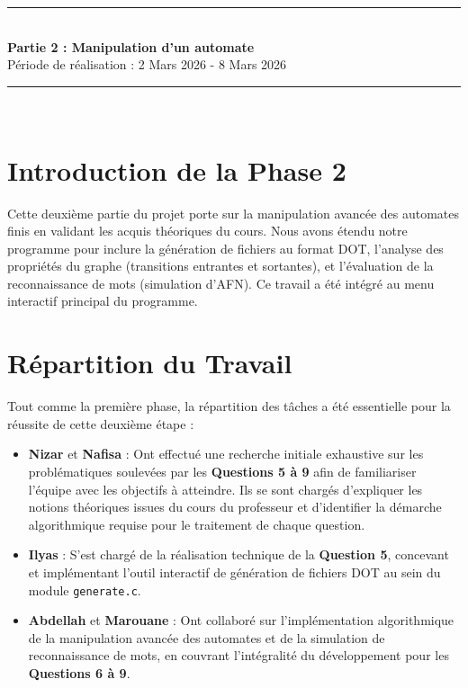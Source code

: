 \documentclass[12pt,a4paper]{article}
\newcommand{\HRule}{\rule{\linewidth}{0.5mm}}
\begin{document}
\newpage
\begin{center}
\vspace*{1cm}
\HRule \\[0.5cm]
\textbf{\huge Partie 2 : Manipulation d'un automate} \\[0.5cm]
\Large Période de réalisation : 2 Mars 2026 - 8 Mars 2026 \\
\HRule \\
\vspace*{1cm}
\end{center}

\section{Introduction de la Phase 2}
Cette deuxième partie du projet porte sur la manipulation avancée des automates finis en validant les acquis théoriques du cours. Nous avons étendu notre programme pour inclure la génération de fichiers au format DOT, l'analyse des propriétés du graphe (transitions entrantes et sortantes), et l'évaluation de la reconnaissance de mots (simulation d'AFN). Ce travail a été intégré au menu interactif principal du programme.

\section{Répartition du Travail}
Tout comme la première phase, la répartition des tâches a été essentielle pour la réussite de cette deuxième étape :
\begin{itemize}
\item \textbf{Nizar} et \textbf{Nafisa} : Ont effectué une recherche initiale exhaustive sur les problématiques soulevées par les \textbf{Questions 5 à 9} afin de familiariser l'équipe avec les objectifs à atteindre. Ils se sont chargés d'expliquer les notions théoriques issues du cours du professeur et d'identifier la démarche algorithmique requise pour le traitement de chaque question.
\item \textbf{Ilyas} : S'est chargé de la réalisation technique de la \textbf{Question 5}, concevant et implémentant l'outil interactif de génération de fichiers DOT au sein du module \texttt{generate.c}.
\item \textbf{Abdellah} et \textbf{Marouane} : Ont collaboré sur l'implémentation algorithmique de la manipulation avancée des automates et de la simulation de reconnaissance de mots, en couvrant l'intégralité du développement pour les \textbf{Questions 6 à 9}.
\end{itemize}
\end{document}
